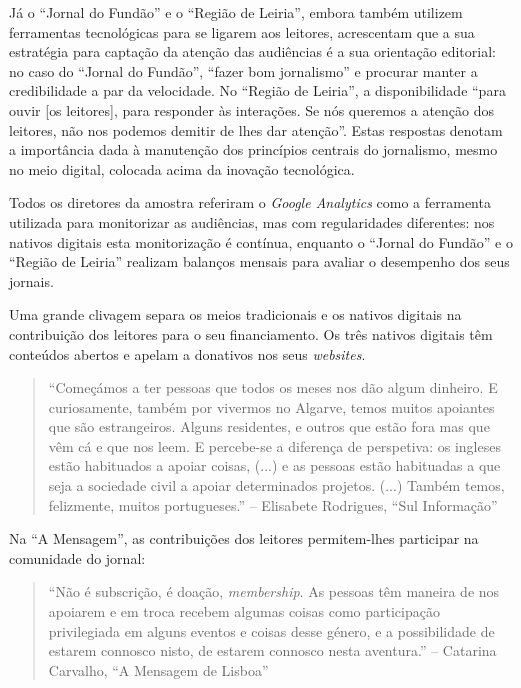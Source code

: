 \documentclass[portuguese]{textolivre}
\begin{document}
Já o ``Jornal do Fundão'' e o ``Região de Leiria'', embora também
utilizem ferramentas tecnológicas para se ligarem aos leitores,
acrescentam que a sua estratégia para captação da atenção das audiências
é a sua orientação editorial: no caso do ``Jornal do Fundão'', ``fazer
bom jornalismo'' e procurar manter a credibilidade a par da velocidade.
No ``Região de Leiria'', a disponibilidade ``para ouvir {[}os
leitores{]}, para responder às interações. Se nós queremos a atenção dos
leitores, não nos podemos demitir de lhes dar atenção''. Estas respostas
denotam a importância dada à manutenção dos princípios centrais do
jornalismo, mesmo no meio digital, colocada acima da inovação
tecnológica.

Todos os diretores da amostra referiram o \emph{Google Analytics }como a
ferramenta utilizada para monitorizar as audiências, mas com
regularidades diferentes: nos nativos digitais esta monitorização é
contínua, enquanto o ``Jornal do Fundão'' e o ``Região de Leiria''
realizam balanços mensais para avaliar o desempenho dos seus jornais.

Uma grande clivagem separa os meios tradicionais e os nativos digitais
na contribuição dos leitores para o seu financiamento. Os três nativos
digitais têm conteúdos abertos e apelam a donativos nos seus
\emph{websites}.

\begin{quote}
``Começámos a ter pessoas que todos os meses nos dão algum dinheiro. E
curiosamente, também por vivermos no Algarve, temos muitos apoiantes que
são estrangeiros. Alguns residentes, e outros que estão fora mas que vêm
cá e que nos leem. E percebe-se a diferença de perspetiva: os ingleses
estão habituados a apoiar coisas, (...) e as pessoas estão habituadas a
que seja a sociedade civil a apoiar determinados projetos. (...) Também
temos, felizmente, muitos portugueses.'' -- Elisabete Rodrigues, ``Sul
Informação''
\end{quote}

Na ``A Mensagem'', as contribuições dos leitores permitem-lhes participar na
comunidade do jornal:

\begin{quote}
``Não é subscrição, é doação, \emph{membership}. As pessoas têm maneira
de nos apoiarem e em troca recebem algumas coisas como participação
privilegiada em alguns eventos e coisas desse género, e a possibilidade
de estarem connosco nisto, de estarem connosco nesta aventura.'' --
Catarina Carvalho, ``A Mensagem de Lisboa''
\end{quote}
\end{document}
